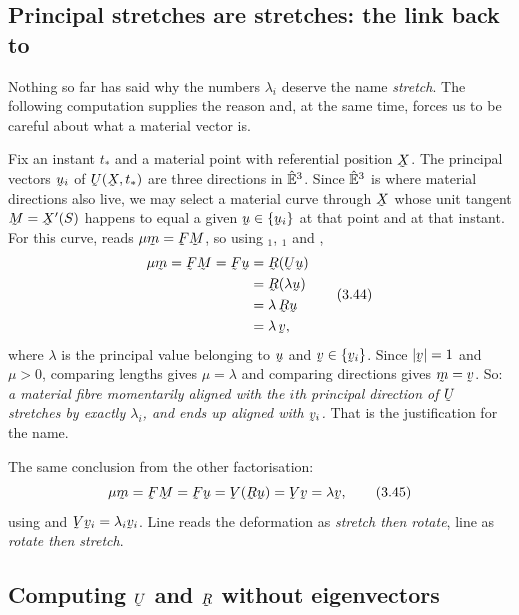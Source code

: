 \subsection*{Principal stretches are stretches: the link back to }

Nothing so far has said why the numbers $\lambda_{i}$ deserve the name
\emph{stretch}. The following computation supplies the reason and, at the
same time, forces us to be careful about what a material vector is.

Fix an instant $t_{*}$ and a material point with referential position
$\bX$. The principal vectors $\bu_{i}$ of $\bU(\bX,t_{*})$ are three
directions in $\hat{\mathbb{E}}^{3}$. Since $\hat{\mathbb{E}}^{3}$ is where material directions also live,
we may select a material curve through $\bX$ whose unit tangent
$\bM=\bX'(S)$ happens to equal a given $\bu\in\{\bu_{i}\}$ at that point
and at that instant. For this curve,  reads $\mu\bm=\bF\bM$, so
using $_{1}$, $_{1}$ and ,
\begin{equation}
\begin{aligned}
   \mu\bm=\bF\bM=\bF\bu
   &=\bR(\bU\bu)\\
   &=\bR(\lambda\bu)\\
   &=\lambda\,\bR\bu\\
   &=\lambda\,\bv ,
\end{aligned}
   \tag{3.44}\label{eq:3.44}
\end{equation}
where $\lambda$ is the principal value belonging to $\bu$ and
$\bv\in\{\bv_{i}\}$. Since $|\bv|=1$ and $\mu>0$, comparing lengths gives
$\mu=\lambda$ and comparing directions gives $\bm=\bv$. So: \emph{a
material fibre momentarily aligned with the $i$th principal direction of
$\bU$ stretches by exactly $\lambda_{i}$, and ends up aligned with
$\bv_{i}$.} That is the justification for the name.

The same conclusion from the other factorisation:
\begin{equation}
   \mu\bm=\bF\bM=\bF\bu=\bV(\bR\bu)=\bV\bv=\lambda\bv ,
   \tag{3.45}\label{eq:3.45}
\end{equation}
using  and $\bV\bv_{i}=\lambda_{i}\bv_{i}$. Line  reads
the deformation as \emph{stretch then rotate}, line  as
\emph{rotate then stretch}.

\subsection*{Computing $\bU$ and $\bR$ without eigenvectors}

